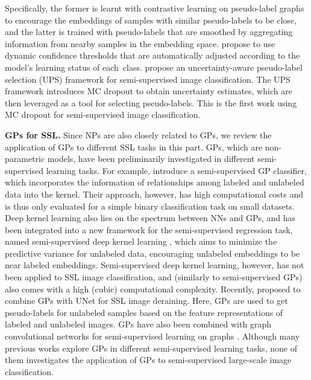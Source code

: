 \documentclass[nohyperref]{article}
\theoremstyle{plain}
\theoremstyle{definition}
\theoremstyle{remark}
\begin{document}
Specifically, the former is learnt with contrastive learning on pseudo-label graphs to encourage the embeddings of samples with similar pseudo-labels to be close, and the latter is trained with pseudo-labels that are smoothed by aggregating information from nearby samples in the embedding space. \citet{zhang2021flexmatch} propose to use dynamic confidence thresholds that are automatically adjusted according to the model’s learning status of 
each~class. \citet{rizve2021defense} propose an uncertainty-aware
pseudo-label selection (UPS) framework for semi-supervised image classification. The UPS framework introduces MC dropout to obtain uncertainty estimates, which are then leveraged as a tool for selecting pseudo-labels. This is the first work using MC dropout for semi-supervised image classification. 

{\bf GPs for SSL.}  Since NPs are also closely related to GPs, we review the application of GPs to different SSL tasks in this part.
GPs, which are non-parametric models, have been preliminarily investigated in different semi-supervised learning tasks. For example, \citet{sindhwani2007semi} introduce a semi-supervised GP classifier, which incorporates the information of relationships among labeled and unlabeled data  into the kernel. Their approach, however, has high  computational costs and is thus only evaluated for a simple binary classification task on small datasets.  Deep kernel learning  \cite{wilson2016deep} also lies on the spectrum between NNs and GPs, and has been integrated into a new framework for the semi-supervised regression task, named semi-supervised deep kernel learning  \cite{jean2018semi}, which  aims to minimize the predictive variance for unlabeled data,  encouraging  unlabeled embeddings to be near labeled embeddings. Semi-supervised deep kernel learning, however, has not been applied to SSL image classification, and (similarly to semi-supervised GPs) also comes with a high (cubic) computational complexity. 
Recently, \citet{yasarla2020syn2real} proposed to combine GPs with UNet \cite{ronneberger2015u} for SSL image deraining. Here, GPs are used to get pseudo-labels for unlabeled samples based on the feature representations of labeled and unlabeled images. GPs have also been combined with graph convolutional networks for  semi-supervised learning on graphs \cite{ng2018bayesian, walker2019graph, liu2020uncertainty}. 
Although many previous works explore GPs in different semi-supervised learning tasks, none of them investigates the application of GPs to  semi-supervised large-scale image classification. 
 
\end{document}
